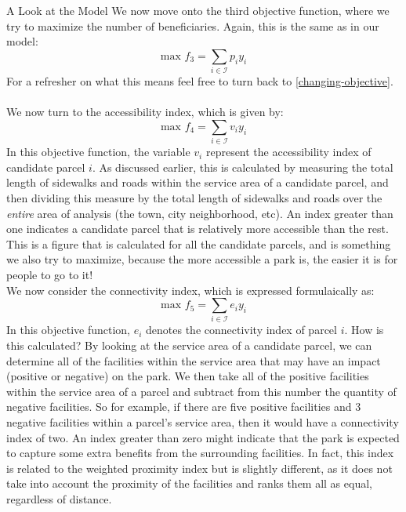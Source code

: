 \documentclass[12pt]{pom_thesis}
\theoremstyle{definition}
\begin{document}
\begin{chapter}{A Look at the Model}
We now move onto the third objective function, where we try to maximize the number of beneficiaries. Again, this is the same as in our model:
\begin{equation} \label{objective-3}
\textrm{max } f_3 = \sum_{i \in \mathcal{I}} p_iy_i
\end{equation}
For a refresher on what this means feel free to turn back to \autoref{changing-objective}. \\ \\
%
We now turn to the accessibility index, which is given by:
\begin{equation} \label{objective-4}
\textrm{max } f_4 = \sum_{i \in \mathcal{I}} v_iy_i
\end{equation}
In this objective function, the variable $v_i$ represent the accessibility index of candidate parcel $i$. As discussed earlier, this is calculated by measuring the total length of sidewalks and roads within the service area of a candidate parcel, and then dividing this measure by the total length of sidewalks and roads over the \textit{entire} area of analysis (the town, city neighborhood, etc). An index greater than one indicates a candidate parcel that is relatively more accessible than the rest.  This is a figure that is calculated for all the candidate parcels, and is something we also try to maximize, because the more accessible a park is, the easier it is for people to go to it! \\

We now consider the connectivity index, which is expressed formulaically as:
\begin{equation} \label{objective-5}
\textrm{max } f_5 = \sum_{i \in \mathcal{I}} e_iy_i
\end{equation}
In this objective function, $e_i$ denotes the connectivity index of parcel $i$. How is this calculated? By looking at the service area of a candidate parcel, we can determine all of the facilities within the service area that may have an impact (positive or negative) on the park. We then take all of the positive facilities within the service area of a parcel and subtract from this number the quantity of negative facilities. So for example, if there are five positive facilities and 3 negative facilities within a parcel's service area, then it would have a connectivity index of two. An index greater than zero might indicate that the park is expected to capture some extra benefits from the surrounding facilities. In fact, this index is related to the weighted proximity index but is slightly different, as it does not take into account the proximity of the facilities and ranks them all as equal, regardless of distance. \\


\end{chapter}
\end{document}
